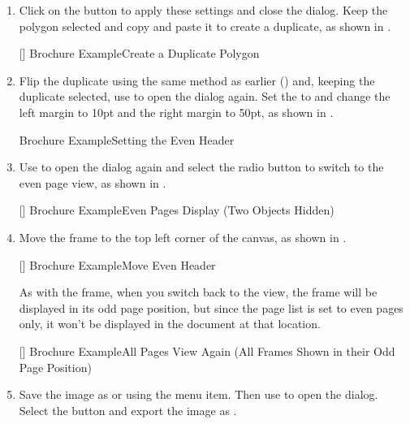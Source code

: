 \begin{enumerate}
{}
{Brochure Example\dash Setting The Odd Header}

\item Click on the  button to apply these settings and close the
dialog. Keep the polygon selected and copy and paste it to create a
duplicate, as shown in .

[]
{}
{Brochure Example\dash Create a Duplicate Polygon}

\item Flip the duplicate using the same method as earlier
() and, keeping the duplicate
selected, use  to open the
 dialog again. Set the
 to  and change the
left margin to 10\gls{pt} and the right margin to 50\gls*{pt}, as
shown in .

{}
{Brochure Example\dash Setting the Even Header}

\item Use  to open the
 dialog again and select the
 radio button to switch to the even
page view, as shown in .

[]
{}
{Brochure Example\dash Even Pages Display (Two Objects Hidden)}

\item Move the  frame to the top left corner of the
\gls{canvas}, as shown in .

[]
{}
{Brochure Example\dash Move Even Header}

As with the  frame, when you switch back to the
 view, the frame will be displayed in its odd page
position, but since the page list is set to even pages only, it
won't be displayed in the document at that location.

[]
{}
{Brochure Example\dash All Pages View Again (All Frames Shown in their
Odd Page Position)}

\item Save the image as  or
 using the  menu
item. Then use  to open the
 dialog. Select the
 button and export the image as
.


\end{enumerate}
